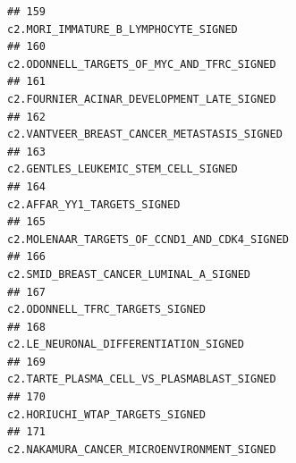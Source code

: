 \documentclass{article}\usepackage[]{graphicx}\usepackage[]{color}
\makeatletter
\newenvironment{kframe}{%
 \def\at@end@of@kframe{}%
 \ifinner\ifhmode%
  \def\at@end@of@kframe{\end{minipage}}%
  \begin{minipage}{\columnwidth}%
 \fi\fi%
 \def\FrameCommand##1{\hskip\@totalleftmargin \hskip-\fboxsep
 \colorbox{shadecolor}{##1}\hskip-\fboxsep
     \hskip-\linewidth \hskip-\@totalleftmargin \hskip\columnwidth}%
 \MakeFramed {\advance\hsize-\width
   \@totalleftmargin\z@ \linewidth\hsize
   \@setminipage}}%
 {\par\unskip\endMakeFramed%
 \at@end@of@kframe}
\newenvironment{knitrout}{}{} %
\makeatother
\begin{document}
\begin{knitrout}
\begin{kframe}
\begin{verbatim}
## 159                                                                                                                                                                             c2.MORI_IMMATURE_B_LYMPHOCYTE_SIGNED
## 160                                                                                                                                                                       c2.ODONNELL_TARGETS_OF_MYC_AND_TFRC_SIGNED
## 161                                                                                                                                                                       c2.FOURNIER_ACINAR_DEVELOPMENT_LATE_SIGNED
## 162                                                                                                                                                                      c2.VANTVEER_BREAST_CANCER_METASTASIS_SIGNED
## 163                                                                                                                                                                             c2.GENTLES_LEUKEMIC_STEM_CELL_SIGNED
## 164                                                                                                                                                                                      c2.AFFAR_YY1_TARGETS_SIGNED
## 165                                                                                                                                                                     c2.MOLENAAR_TARGETS_OF_CCND1_AND_CDK4_SIGNED
## 166                                                                                                                                                                           c2.SMID_BREAST_CANCER_LUMINAL_A_SIGNED
## 167                                                                                                                                                                                  c2.ODONNELL_TFRC_TARGETS_SIGNED
## 168                                                                                                                                                                            c2.LE_NEURONAL_DIFFERENTIATION_SIGNED
## 169                                                                                                                                                                       c2.TARTE_PLASMA_CELL_VS_PLASMABLAST_SIGNED
## 170                                                                                                                                                                                  c2.HORIUCHI_WTAP_TARGETS_SIGNED
## 171                                                                                                                                                                       c2.NAKAMURA_CANCER_MICROENVIRONMENT_SIGNED

\end{verbatim}
\end{kframe}
\end{knitrout}
\end{document}
